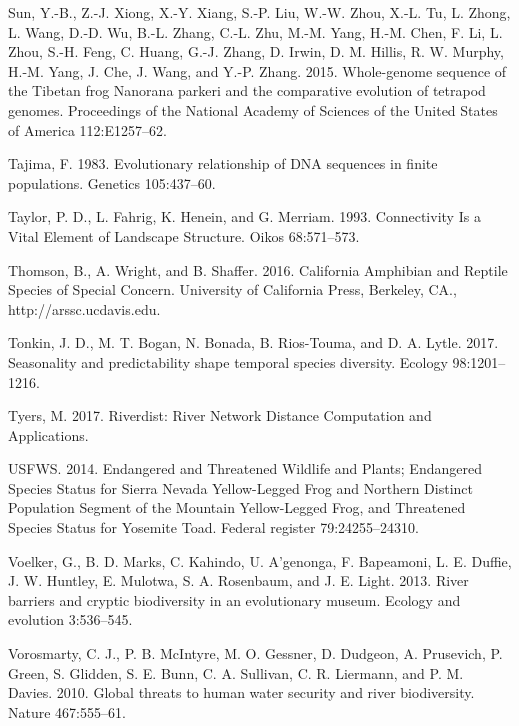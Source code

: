 \documentclass[proquest,12pt,final]{ucthesis-CA2012} %
\begin{document}
\begin{ucmainmatter}
\leavevmode\hypertarget{ref-sun_whole-genome_2015}{}%
Sun, Y.-B., Z.-J. Xiong, X.-Y. Xiang, S.-P. Liu, W.-W. Zhou, X.-L. Tu,
L. Zhong, L. Wang, D.-D. Wu, B.-L. Zhang, C.-L. Zhu, M.-M. Yang, H.-M.
Chen, F. Li, L. Zhou, S.-H. Feng, C. Huang, G.-J. Zhang, D. Irwin, D. M.
Hillis, R. W. Murphy, H.-M. Yang, J. Che, J. Wang, and Y.-P. Zhang.
2015. Whole-genome sequence of the Tibetan frog Nanorana parkeri and the
comparative evolution of tetrapod genomes. Proceedings of the National
Academy of Sciences of the United States of America 112:E1257--62.

\leavevmode\hypertarget{ref-tajima_evolutionary_1983}{}%
Tajima, F. 1983. Evolutionary relationship of DNA sequences in finite
populations. Genetics 105:437--60.

\leavevmode\hypertarget{ref-taylor_connectivity_1993}{}%
Taylor, P. D., L. Fahrig, K. Henein, and G. Merriam. 1993. Connectivity
Is a Vital Element of Landscape Structure. Oikos 68:571--573.

\leavevmode\hypertarget{ref-thomson_california_2016}{}%
Thomson, B., A. Wright, and B. Shaffer. 2016. California Amphibian and
Reptile Species of Special Concern. University of California Press,
Berkeley, CA., http://arssc.ucdavis.edu.

\leavevmode\hypertarget{ref-tonkin_seasonality_2017}{}%
Tonkin, J. D., M. T. Bogan, N. Bonada, B. Rios-Touma, and D. A. Lytle.
2017. Seasonality and predictability shape temporal species diversity.
Ecology 98:1201--1216.

\leavevmode\hypertarget{ref-tyers_riverdist_2017}{}%
Tyers, M. 2017. Riverdist: River Network Distance Computation and
Applications.

\leavevmode\hypertarget{ref-usfws_endangered_2014}{}%
USFWS. 2014. Endangered and Threatened Wildlife and Plants; Endangered
Species Status for Sierra Nevada Yellow-Legged Frog and Northern
Distinct Population Segment of the Mountain Yellow-Legged Frog, and
Threatened Species Status for Yosemite Toad. Federal register
79:24255--24310.

\leavevmode\hypertarget{ref-voelker_river_2013}{}%
Voelker, G., B. D. Marks, C. Kahindo, U. A'genonga, F. Bapeamoni, L. E.
Duffie, J. W. Huntley, E. Mulotwa, S. A. Rosenbaum, and J. E. Light.
2013. River barriers and cryptic biodiversity in an evolutionary museum.
Ecology and evolution 3:536--545.

\leavevmode\hypertarget{ref-vorosmarty_global_2010}{}%
Vorosmarty, C. J., P. B. McIntyre, M. O. Gessner, D. Dudgeon, A.
Prusevich, P. Green, S. Glidden, S. E. Bunn, C. A. Sullivan, C. R.
Liermann, and P. M. Davies. 2010. Global threats to human water security
and river biodiversity. Nature 467:555--61.


\end{ucmainmatter}
\end{document}
